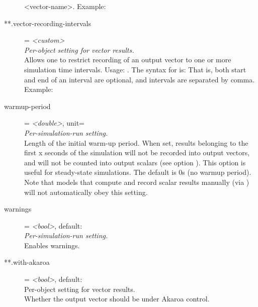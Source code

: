 \begin{description}
{    {\allowbreak}<vector-{\allowbreak}name>}. Example:
\item[**.vector-recording-intervals] = \textit{<custom>}\\
    \textit{Per-object setting for vector results.}\\
    Allows one to restrict recording of an output vector to one or more
    simulation time intervals. Usage:
    .
    The syntax for  is:
     That is,
    both start and end of an interval are optional, and intervals are separated
    by comma.\\
    Example:
\item[warmup-period] = \textit{<double>}, unit=\\
    \textit{Per-simulation-run setting.}\\
    Length of the initial warm-up period. When set, results belonging to the
    first x seconds of the simulation will not be recorded into output vectors,
    and will not be counted into output scalars (see option
    ).
    This option is useful for steady-state simulations. The default is 0s (no
    warmup period). Note that models that compute and record scalar results
    manually (via ) will not automatically obey this
    setting.
\item[warnings] = \textit{<bool>}, default: \\
    \textit{Per-simulation-run setting.}\\
    Enables warnings.
\item[**.with-akaroa] = \textit{<bool>}, default: \\
    Per-object setting for vector results.\\
    Whether the output vector should be under Akaroa control.
\end{description}

